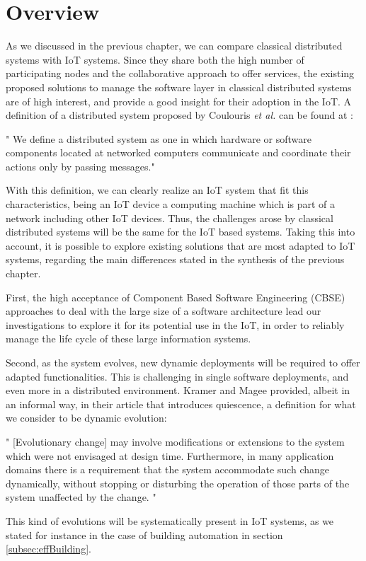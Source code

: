 \section{Overview}
As we discussed in the previous chapter, we can compare classical distributed systems with IoT systems.
Since they share both the high number of participating nodes and the collaborative approach to offer services, the existing proposed solutions to manage the software layer in classical distributed systems are of high interest, and provide a good insight for their adoption in the IoT.
A definition of a distributed system proposed by Coulouris \textit{et al.} can be found at \cite{coulouris2005distributed}:
\begin{citeverbatim}
	" We define a distributed system as one in which hardware or software components located at networked computers communicate and coordinate their actions only by passing messages."
\end{citeverbatim}
With this definition, we can clearly realize an IoT system that fit this characteristics, being an IoT device a computing machine which is part of a network including other IoT devices.
Thus, the challenges arose by classical distributed systems will be the same for the IoT based systems.
Taking this into account, it is possible to explore existing solutions that are most adapted to IoT systems, regarding the main differences stated in the synthesis of the previous chapter.

First, the high acceptance of Component Based Software Engineering (CBSE)\cite{crnkovic2002building} approaches to deal with the large size of a software architecture lead our investigations to explore it for its potential use in the IoT, in order to reliably manage the life cycle of these large information systems.

Second, as the system evolves, new dynamic deployments will be required to offer adapted functionalities.
This is challenging in single software deployments, and even more in a distributed environment.
Kramer and Magee\cite{kramer1990evolving} provided, albeit in an informal way, in their article that introduces quiescence, a definition for what we consider to be dynamic evolution:
\begin{citeverbatim}
	" [Evolutionary change] may involve modifications or extensions to the system which were not envisaged at design time.
	Furthermore, in many application domains there is a requirement that the system accommodate such change dynamically, without stopping or disturbing the operation of those parts of the system unaffected by the change. "
\end{citeverbatim}
This kind of evolutions will be systematically present in IoT systems, as we stated for instance in the case of building automation in section \ref{subsec:effBuilding}.

